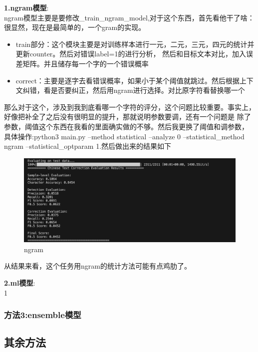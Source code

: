 \documentclass[answers]{exam}  %
\begin{document}
\textbf{1.ngram模型}:\\
ngram模型主要是要修改\_train\_ngram\_model,对于这个东西，首先看他干了啥：很显然，现在是最简单的，一个gram的实现。
\begin{itemize}
    \item train部分：这个模块主要是对训练样本进行一元，二元，三元，四元的统计并更新counter。然后对错误label=1的进行分析，
    然后和目标文本对比，加入误差矩阵。并且储存每一个字的一个错误概率
    \item correct：主要是逐字去看错误概率，如果小于某个阈值就跳过。然后根据上下文纠错，看是否要纠正，然后用ngram进行选择。对比原字符看替换哪一个
\end{itemize}
那么对于这个，涉及到我到底看哪一个字符的评分，这个问题比较重要。事实上，好像把补全了之后没有很明显的提升，那就说明参数要调，还有一个问题是
除了参数，阈值这个东西在我看的里面确实做的不够。然后我更换了阈值和调参数，
具体操作:python3 main.py --method statistical --analyze 0 --statistical\_method ngram --statistical\_optparam 1.然后做出来的结果如下 \\
\begin{figure}[h]
    \centering
    \label{ngram}
    \includegraphics[width=1\textwidth]{../pic/ngram.png} 
    \caption{ngram}  
\end{figure}

从结果来看，这个任务用ngram的统计方法可能有点鸡肋了。

\medskip

\textbf{2.ml模型}:\\
1

\subsubsection{方法3:ensemble模型}

\subsection{其余方法}
\end{document}
